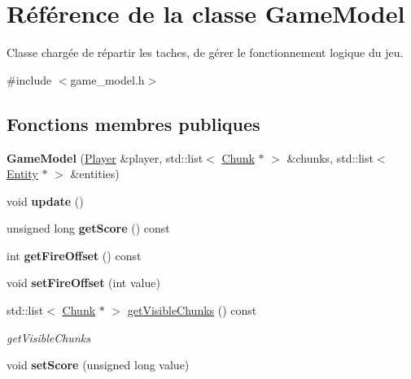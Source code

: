 \hypertarget{class_game_model}{\section{Référence de la classe Game\+Model}
\label{class_game_model}
}


Classe chargée de répartir les taches, de gérer le fonctionnement logique du jeu.  




{\ttfamily \#include $<$game\+\_\+model.\+h$>$}

\subsection*{Fonctions membres publiques}
\begin{DoxyCompactItemize}
\item 
\hypertarget{class_game_model_ab73bf8f197964f52e0b9557721021ad4}{{\bfseries Game\+Model} (\hyperlink{class_player}{Player} \&player, std\+::list$<$ \hyperlink{class_chunk}{Chunk} $\ast$ $>$ \&chunks, std\+::list$<$ \hyperlink{class_entity}{Entity} $\ast$ $>$ \&entities)}\label{class_game_model_ab73bf8f197964f52e0b9557721021ad4}

\item 
\hypertarget{class_game_model_a26c53e2bba15cfbc615579ffdd713358}{void {\bfseries update} ()}\label{class_game_model_a26c53e2bba15cfbc615579ffdd713358}

\item 
\hypertarget{class_game_model_a7be2ff8b9d15a790d5c463a6a9545dbf}{unsigned long {\bfseries get\+Score} () const }\label{class_game_model_a7be2ff8b9d15a790d5c463a6a9545dbf}

\item 
\hypertarget{class_game_model_a24941d3fe8a10ce5dd2c1f7df362e43d}{int {\bfseries get\+Fire\+Offset} () const }\label{class_game_model_a24941d3fe8a10ce5dd2c1f7df362e43d}

\item 
\hypertarget{class_game_model_a9628401361e24f1d0e4b53689a6559b6}{void {\bfseries set\+Fire\+Offset} (int value)}\label{class_game_model_a9628401361e24f1d0e4b53689a6559b6}

\item 
std\+::list$<$ \hyperlink{class_chunk}{Chunk} $\ast$ $>$ \hyperlink{class_game_model_a20185bd5c5c79e5d1d663600fb35e7e9}{get\+Visible\+Chunks} () const 
\begin{DoxyCompactList}\small\item\em get\+Visible\+Chunks \end{DoxyCompactList}\item 
\hypertarget{class_game_model_adeccbd3824ba761f672565c2e387292b}{void {\bfseries set\+Score} (unsigned long value)}\label{class_game_model_adeccbd3824ba761f672565c2e387292b}


\end{DoxyCompactItemize}
